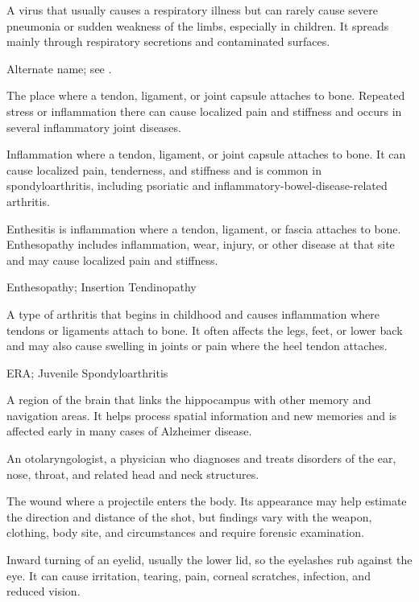  A virus that usually causes a respiratory illness but can rarely cause severe pneumonia or sudden weakness of the limbs, especially in children. It spreads mainly through respiratory secretions and contaminated surfaces.

 Alternate name; see .

 The place where a tendon, ligament, or joint capsule attaches to bone. Repeated stress or inflammation there can cause localized pain and stiffness and occurs in several inflammatory joint diseases.

 Inflammation where a tendon, ligament, or joint capsule attaches to bone. It can cause localized pain, tenderness, and stiffness and is common in spondyloarthritis, including psoriatic and inflammatory-bowel-disease-related arthritis.

 Enthesitis is inflammation where a tendon, ligament, or fascia attaches to bone. Enthesopathy includes inflammation, wear, injury, or other disease at that site and may cause localized pain and stiffness.

\synonyms
Enthesopathy; Insertion Tendinopathy

 A type of arthritis that begins in childhood and causes inflammation where tendons or ligaments attach to bone. It often affects the legs, feet, or lower back and may also cause swelling in joints or pain where the heel tendon attaches.

\synonyms
ERA; Juvenile Spondyloarthritis

 A region of the brain that links the hippocampus with other memory and navigation areas. It helps process spatial information and new memories and is affected early in many cases of Alzheimer disease.

 An otolaryngologist, a physician who diagnoses and treats disorders of the ear, nose, throat, and related head and neck structures.

 The wound where a projectile enters the body. Its appearance may help estimate the direction and distance of the shot, but findings vary with the weapon, clothing, body site, and circumstances and require forensic examination.

 Inward turning of an eyelid, usually the lower lid, so the eyelashes rub against the eye. It can cause irritation, tearing, pain, corneal scratches, infection, and reduced vision.

